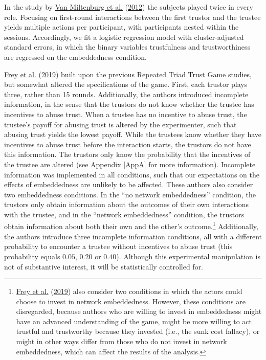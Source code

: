 \documentclass[
  11pt,
]{article}
\begin{document}
In the study by \protect\hyperlink{ref-miltenburg_buskens_triads_2012}{Van Miltenburg et al.} (\protect\hyperlink{ref-miltenburg_buskens_triads_2012}{2012}) the subjects played twice in every role.
Focusing on first-round interactions between the first trustor and the trustee yields multiple actions per participant, with participants nested within the sessions.
Accordingly, we fit a logistic regression model with cluster-adjusted standard errors, in which the binary variables trustfulness and trustworthiness are regressed on the embeddedness condition.

\protect\hyperlink{ref-frey_buskens_investments_2019}{Frey et al.} (\protect\hyperlink{ref-frey_buskens_investments_2019}{2019}) built upon the previous Repeated Triad Trust Game studies, but somewhat altered the specifications of the game.
First, each trustor plays three, rather than 15 rounds.
Additionally, the authors introduced incomplete information, in the sense that the trustors do not know whether the trustee has incentives to abuse trust.
When a trustee has no incentive to abuse trust, the trustee's payoff for abusing trust is altered by the experimenter, such that abusing trust yields the lowest payoff.
While the trustees know whether they have incentives to abuse trust before the interaction starts, the trustors do not have this information.
The trustors only know the probability that the incentives of the trustee are altered (see Appendix \ref{AppA} for more information).
Incomplete information was implemented in all conditions, such that our expectations on the effects of embeddedness are unlikely to be affected.
These authors also consider two embeddedness conditions.
In the ``no network embeddedness'' condition, the trustors only obtain information about the outcomes of their own interactions with the trustee, and in the ``network embeddedness'' condition, the trustors obtain information about both their own and the other's outcome.\footnote{\protect\hyperlink{ref-frey_buskens_investments_2019}{Frey et al.} (\protect\hyperlink{ref-frey_buskens_investments_2019}{2019}) also consider two conditions in which the actors could choose to invest in network embeddedness. However, these conditions are disregarded, because authors who are willing to invest in embeddedness might have an advanced understanding of the game, might be more willing to act trustful and trustworthy because they invested (i.e., the sunk cost fallacy), or might in other ways differ from those who do not invest in network embeddedness, which can affect the results of the analysis.}
Additionally, the authors introduce three incomplete information conditions, all with a different probability to encounter a trustee without incentives to abuse trust (this probability equals \(0.05\), \(0.20\) or \(0.40\)).
Although this experimental manipulation is not of substantive interest, it will be statistically controlled for.
\end{document}
